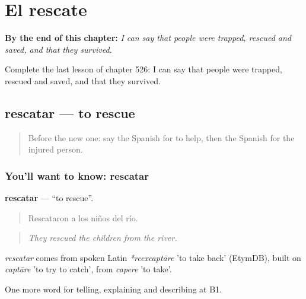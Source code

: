 
\chapter{El rescate}
\label{ch:es-el-rescate}

\begin{chapteropening}
\textbf{By the end of this chapter:} \emph{I can say that people were trapped, rescued and saved, and that they survived.}

Complete the last lesson of chapter 526: I can say that people were trapped, rescued and saved, and that they survived.
\end{chapteropening}

\section[rescatar]{rescatar — to rescue}

\label{lesson:ES-C526-rescatar}



\begin{quote}
Before the new one: say the Spanish for to help, then the Spanish for the injured person.
\end{quote}

\subsection*{You'll want to know: rescatar}
\textbf{rescatar} — \textquotedblleft{}to rescue\textquotedblright{}.

\begin{quote}
Rescataron a los niños del río.
\end{quote}

\begin{quote}
\emph{They rescued the children from the river.}
\end{quote}

\begin{cousinweb}
\emph{rescatar} comes from spoken Latin \emph{*reexcaptāre} 'to take back' (EtymDB), built on \emph{captāre} 'to try to catch', from \emph{capere} 'to take'.
\end{cousinweb}

\begin{grammarlens}[title={What you've built}]
One more word for telling, explaining and describing at B1.
\end{grammarlens}

